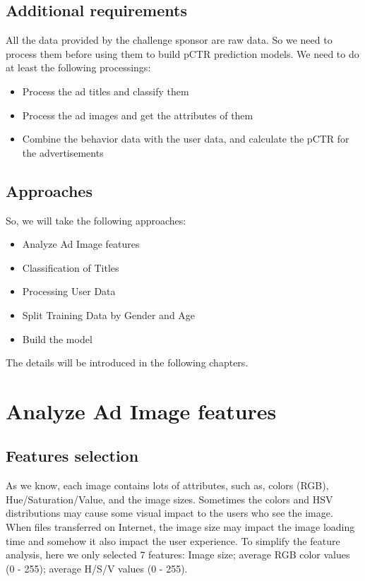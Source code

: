 \documentclass{article} %
\begin{document}
\subsection{Additional requirements}
All the data provided by the challenge sponsor are raw data. So we need to process them before using them to build pCTR prediction models. We need to do at least the following processings:
\begin{itemize}
\item Process the ad titles and classify them
\item Process the ad images and get the attributes of them
\item Combine the behavior data with the user data, and calculate the pCTR for the advertisements
\end{itemize}

\subsection{Approaches}
So, we will take the following approaches:

\begin{itemize}
\item Analyze Ad Image features
\item Classification of Titles
\item Processing User Data
\item Split Training Data by Gender and Age
\item Build the model
\end{itemize}

The details will be introduced in the following chapters.

\section{Analyze Ad Image features}

\subsection{Features selection}
As we know, each image contains lots of attributes, such as, colors (RGB), Hue/Saturation/Value, and the image sizes. Sometimes the colors and HSV distributions may cause some visual impact to the users who see the image. When files transferred on Internet, the image size may impact the image loading time and somehow it also impact the user experience.
To simplify the feature analysis, here we only selected 7 features: Image size; average RGB color values (0 - 255); average H/S/V values (0 - 255).
\end{document}
